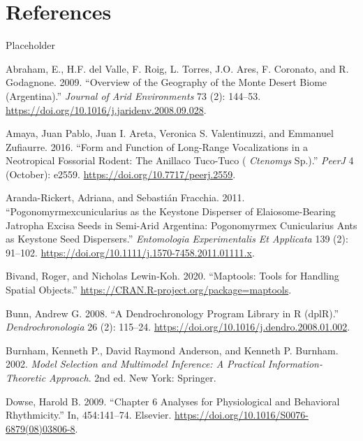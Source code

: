 \documentclass[english,msc,numbers,hidelinks]{coppe}
\newlength{\cslhangindent}
\newenvironment{CSLReferences}[2] %
 {%
  \setlength{\parindent}{0pt}
  \ifodd #1 \everypar{\setlength{\hangindent}{\cslhangindent}}\ignorespaces\fi
  \ifnum #2 > 0
  \setlength{\parskip}{#2\baselineskip}
  \fi
 }%
 {}
\begin{document}
  \hypertarget{references}{%
  \chapter*{References}\label{references}}

  Placeholder

  \hypertarget{refs}{}
  \begin{CSLReferences}{1}{0}
  \leavevmode{}%
  Abraham, E., H.F. del Valle, F. Roig, L. Torres, J.O. Ares, F. Coronato, and R. Godagnone. 2009. {``Overview of the Geography of the Monte Desert Biome (Argentina).''} \emph{Journal of Arid Environments} 73 (2): 144--53. \url{https://doi.org/10.1016/j.jaridenv.2008.09.028}.

  \leavevmode{}%
  Amaya, Juan Pablo, Juan I. Areta, Veronica S. Valentinuzzi, and Emmanuel Zufiaurre. 2016. {``Form and Function of Long-Range Vocalizations in a Neotropical Fossorial Rodent: The Anillaco Tuco-Tuco ( {\emph{Ctenomys}} Sp.).''} \emph{PeerJ} 4 (October): e2559. \url{https://doi.org/10.7717/peerj.2559}.

  \leavevmode{}%
  Aranda-Rickert, Adriana, and Sebastián Fracchia. 2011. {``Pogonomyrmexcunicularius as the Keystone Disperser of Elaiosome-Bearing Jatropha Excisa Seeds in Semi-Arid Argentina: Pogonomyrmex Cunicularius Ants as Keystone Seed Dispersers.''} \emph{Entomologia Experimentalis Et Applicata} 139 (2): 91--102. \url{https://doi.org/10.1111/j.1570-7458.2011.01111.x}.

  \leavevmode{}%
  Bivand, Roger, and Nicholas Lewin-Koh. 2020. {``Maptools: Tools for Handling Spatial Objects.''} \url{https://CRAN.R-project.org/package=maptools}.

  \leavevmode{}%
  Bunn, Andrew G. 2008. {``A Dendrochronology Program Library in R (dplR).''} \emph{Dendrochronologia} 26 (2): 115--24. \url{https://doi.org/10.1016/j.dendro.2008.01.002}.

  \leavevmode{}%
  Burnham, Kenneth P., David Raymond Anderson, and Kenneth P. Burnham. 2002. \emph{Model Selection and Multimodel Inference: A Practical Information-Theoretic Approach}. 2nd ed. New York: Springer.

  \leavevmode{}%
  Dowse, Harold B. 2009. {``Chapter 6 Analyses for Physiological and Behavioral Rhythmicity.''} In, 454:141--74. Elsevier. \url{https://doi.org/10.1016/S0076-6879(08)03806-8}.


\end{CSLReferences}
\end{document}
